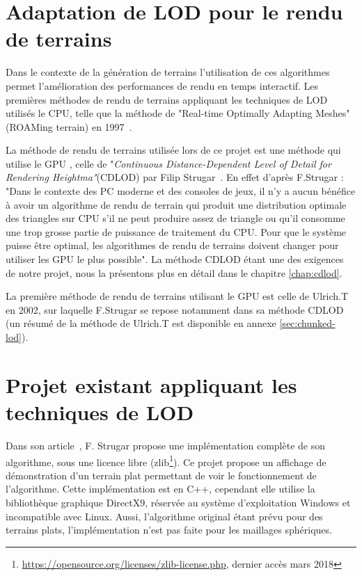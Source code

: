 \section*{Adaptation de LOD pour le rendu de terrains}

Dans le contexte de la génération de terrains l'utilisation de ces algorithmes permet l'amélioration des performances de rendu en temps interactif.
Les premières méthodes de rendu de terrains appliquant les techniques de LOD utilisés le CPU, telle que la méthode de "Real-time Optimally Adapting Meshes" (ROAMing terrain) en 1997~\cite{ROAM}.

La méthode de rendu de terrains utilisée lors de ce projet est une méthode qui utilise le GPU , celle de "\emph{Continuous Distance-Dependent Level of Detail for Rendering Heightma"}(CDLOD) par Filip Strugar~\cite{CDLOD}. En effet d'après F.Strugar : "Dans le contexte des PC moderne et des consoles de jeux, il n'y a aucun bénéfice à avoir un algorithme de rendu de terrain qui produit une distribution optimale des triangles sur CPU s'il ne peut produire assez de triangle ou qu'il consomme une trop grosse partie de puissance de traitement du CPU. Pour que le système puisse être optimal, les algorithmes de rendu de terrains doivent changer pour utiliser les GPU le plus possible". La méthode CDLOD étant une des exigences de notre projet, nous la présentons plus en détail dans le chapitre \ref{chap:cdlod}.

La première méthode de rendu de terrains utilisant le GPU est celle de Ulrich.T~\cite{CLOD} en 2002, sur laquelle F.Strugar se repose notamment dans sa méthode CDLOD (un résumé de la méthode de Ulrich.T est disponible en annexe \ref{sec:chunked-lod}).

\section*{Projet existant appliquant les techniques de LOD}

Dans son article~\cite{CDLOD}, F. Strugar propose une implémentation
complète de son algorithme, sous une licence libre
(zlib\footnote{\url{https://opensource.org/licenses/zlib-license.php},
dernier accès mars 2018}). Ce projet propose un affichage de
démonstration d'un terrain plat permettant de voir le fonctionnement de
l'algorithme. Cette implémentation est en C++, cependant elle utilise la
bibliothèque graphique DirectX9, réservée au système d'exploitation
Windows et incompatible avec Linux. Aussi, l'algorithme original étant
prévu pour des terrains plats, l'implémentation n'est pas faite pour les
maillages sphériques.

